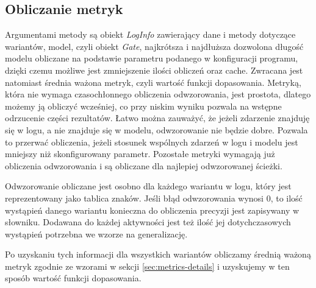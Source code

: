 \subsection{Obliczanie metryk}
Argumentami metody są obiekt \textit{LogInfo} zawierający dane i metody dotyczące wariantów, model, czyli obiekt \textit{Gate}, najkrótsza i najdłuższa dozwolona długość modelu obliczane na podstawie parametru podanego w konfiguracji programu, dzięki czemu możliwe jest zmniejszenie ilości obliczeń oraz cache. Zwracana jest natomiast średnia ważona metryk, czyli wartość funkcji dopasowania. Metryką, która nie wymaga czasochłonnego obliczenia odwzorowania, jest prostota, dlatego możemy ją obliczyć wcześniej, co przy niskim wyniku pozwala na wstępne odrzucenie części rezultatów. Łatwo można zauważyć, że jeżeli zdarzenie znajduję się w logu, a nie znajduje się w modelu, odwzorowanie nie będzie dobre. Pozwala to przerwać obliczenia, jeżeli stosunek wspólnych zdarzeń w logu i modelu jest mniejszy niż skonfigurowany parametr. Pozostałe metryki wymagają już obliczenia odwzorowania i są obliczane dla najlepiej odwzorowanej ścieżki. 

Odwzorowanie obliczane jest osobno dla każdego wariantu w logu, który jest reprezentowany jako tablica znaków. Jeśli błąd odwzorowania wynosi 0, to ilość wystąpień danego wariantu konieczna do obliczenia precyzji jest zapisywany w słowniku. Dodawana do każdej aktywności jest też ilość jej dotychczasowych wystąpień potrzebna we wzorze na generalizację.

Po uzyskaniu tych informacji dla wszystkich wariantów obliczamy średnią ważoną metryk zgodnie ze wzorami w sekcji \ref{sec:metrics-details} i uzyskujemy w ten sposób wartość funkcji dopasowania.

